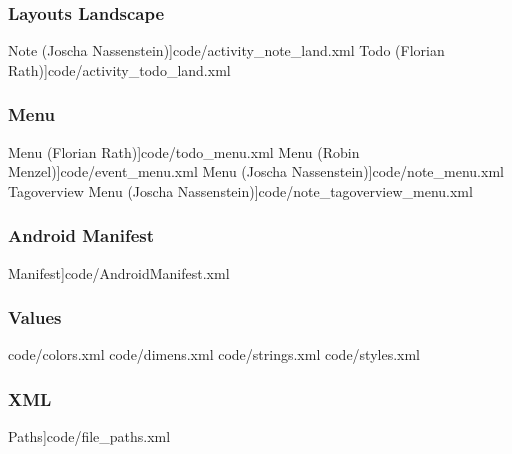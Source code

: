 	\subsubsection{Layouts Landscape}
 Note (Joscha Nassenstein)]{code/activity_note_land.xml}
 Todo (Florian Rath)]{code/activity_todo_land.xml}
	\subsubsection{Menu}
 Menu (Florian Rath)]{code/todo_menu.xml}
 Menu (Robin Menzel)]{code/event_menu.xml}
 Menu (Joscha Nassenstein)]{code/note_menu.xml}
 Tagoverview Menu (Joscha Nassenstein)]{code/note_tagoverview_menu.xml}
	\subsubsection{Android Manifest}
 Manifest]{code/AndroidManifest.xml}
	\subsubsection{Values}
{code/colors.xml}
{code/dimens.xml}
{code/strings.xml}
{code/styles.xml}
	\subsubsection{XML}
 Paths]{code/file_paths.xml}



